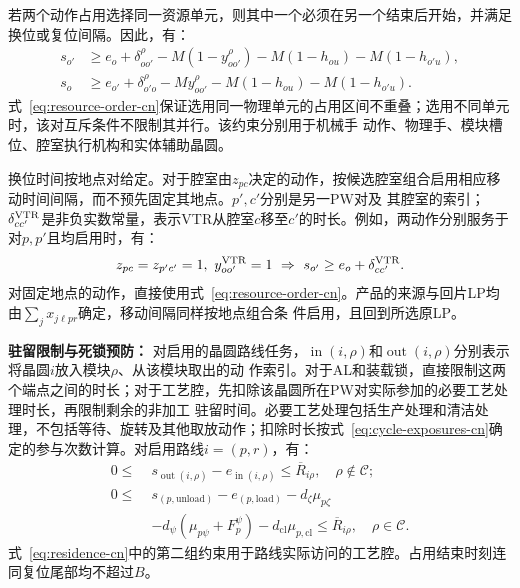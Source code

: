 若两个动作占用选择同一资源单元，则其中一个必须在另一个结束后开始，并满足换位或复位间隔。因此，有：
\begin{equation}
\begin{aligned}
s_{o'}&\ge e_o+\delta^\rho_{oo'}-M(1-y^\rho_{oo'})
-M(1-h_{ou})-M(1-h_{o'u}),\\
s_o&\ge e_{o'}+\delta^\rho_{o'o}-My^\rho_{oo'}
-M(1-h_{ou})-M(1-h_{o'u}).
\end{aligned}
\label{eq:resource-order-cn}
\end{equation}
式~\eqref{eq:resource-order-cn}保证选用同一物理单元的占用区间不重叠；选用不同单元时，该对互斥条件不限制其并行。该约束分别用于机械手
动作、物理手、模块槽位、腔室执行机构和实体辅助晶圆。

换位时间按地点对给定。对于腔室由$z_{pc}$决定的动作，按候选腔室组合启用相应移动时间间隔，而不预先固定其地点。$p',c'$分别是另一PW对及
其腔室的索引；$\delta^{\rm VTR}_{cc'}$是非负实数常量，表示VTR从腔室$c$移至$c'$的时长。例如，两动作分别服务于对$p,p'$且均启用时，有：
\begin{equation}
\begin{aligned}
z_{pc}=z_{p'c'}=1,\ y^{\rm VTR}_{oo'}=1
\ \Rightarrow\ s_{o'}\ge e_o+\delta^{\rm VTR}_{cc'}.
\end{aligned}
\label{eq:location-travel-cn}
\end{equation}
对固定地点的动作，直接使用式~\eqref{eq:resource-order-cn}。产品的来源与回片LP均由$\sum_jx_{j\ell pr}$确定，移动间隔同样按地点组合条
件启用，且回到所选原LP。

\noindent\textbf{驻留限制与死锁预防：}
对启用的晶圆路线任务，$\operatorname{in}(i,\rho)$和$\operatorname{out}(i,\rho)$分别表示将晶圆$i$放入模块$\rho$、从该模块取出的动
作索引。对于AL和装载锁，直接限制这两个端点之间的时长；对于工艺腔，先扣除该晶圆所在PW对实际参加的必要工艺处理时长，再限制剩余的非加工
驻留时间。必要工艺处理包括生产处理和清洁处理，不包括等待、旋转及其他取放动作；扣除时长按式~\eqref{eq:cycle-exposures-cn}确定的参与次数计算。对启用路线$i=(p,r)$，有：
\begin{equation}
\begin{aligned}
0\le\;&s_{\operatorname{out}(i,\rho)}-e_{\operatorname{in}(i,\rho)}
\le\overline R_{i\rho},\quad \rho\notin\mathcal C;\\
0\le\;&s_{(p,\mathrm{unload})}-e_{(p,\mathrm{load})}
-d_\zeta\mu_{p\zeta}\\
&-d_\psi(\mu_{p\psi}+F_p^\psi)
-d_{\mathrm{cl}}\mu_{p,\mathrm{cl}}\le\overline R_{i\rho},
\quad\rho\in\mathcal C.
\end{aligned}
\label{eq:residence-cn}
\end{equation}
式~\eqref{eq:residence-cn}中的第二组约束用于路线实际访问的工艺腔。占用结束时刻连同复位尾部均不超过$B$。

